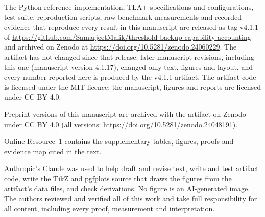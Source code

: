 \documentclass[pdflatex,sn-mathphys-num]{sn-jnl}%
\theoremstyle{plain}
\theoremstyle{definition}
\begin{document}
The Python reference implementation, TLA+ specifications and configurations, test suite, reproduction scripts, raw benchmark measurements and recorded evidence that reproduce every result in this manuscript are released as tag v4.1.1 of \url{https://github.com/SamarjeetMalik/threshold-backup-capability-accounting} and archived on Zenodo at \url{https://doi.org/10.5281/zenodo.24060229}. The artifact has not changed since that release: later manuscript revisions, including this one (manuscript version 4.1.17), changed only text, figures and layout, and every number reported here is produced by the v4.1.1 artifact. The artifact code is licensed under the MIT licence; the manuscript, figures and reports are licensed under CC BY 4.0.

Preprint versions of this manuscript are archived with the artifact on Zenodo under CC BY 4.0 (all versions: \url{https://doi.org/10.5281/zenodo.24048191}).

Online Resource~1 contains the supplementary tables, figures, proofs and evidence map cited in the text.

Anthropic's Claude was used to help draft and revise text, write and test artifact code, write the TikZ and pgfplots source that draws the figures from the artifact's data files, and check derivations. No figure is an AI-generated image. The authors reviewed and verified all of this work and take full responsibility for all content, including every proof, measurement and interpretation.




\end{document}
